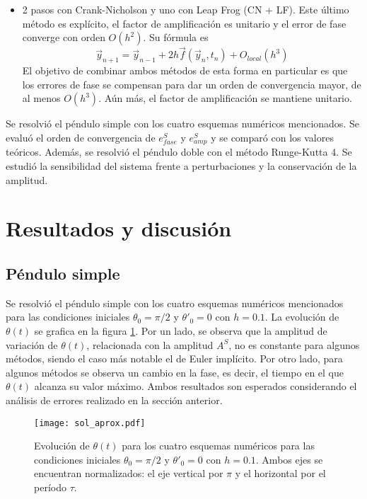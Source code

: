 \documentclass[aps,prb,twocolumn,superscriptaddress,floatfix,longbibliography,10pt]{revtex4-2}
\newif\ifptitle
\newif\ifpnumber
\newcounter{para}
\newcommand\ptitle[1]{\par\refstepcounter{para}
{\ifpnumber{\noindent\textcolor{lightgray}{\textbf{\thepara}}\indent}\fi}
{\ifptitle{\textbf{[{#1}]}}\fi}}
\begin{document}
\begin{itemize}
  \item 2 pasos con Crank-Nicholson y uno con Leap Frog (CN + LF). Este último método es explícito, el factor de amplificación es unitario y el error de fase converge con orden $O(h^2)$. Su fórmula es
  \begin{equation}
    \vec{y}_{n+1} = \vec{y}_{n-1} + 2 h \vec{f}(\vec{y}_n, t_n) + O_{local}(h^3)
    \label{eq:Leap_Frog}
  \end{equation}
  El objetivo de combinar ambos métodos de esta forma en particular es que los errores de fase se compensan para dar un orden de convergencia mayor, de al menos $O(h^3)$. Aún más, el factor de amplificación se mantiene unitario.


\end{itemize}

\ptitle{Resumen de lo que se hará. Qué se resuelve con qué}
Se resolvió el péndulo simple con los cuatro esquemas numéricos mencionados. Se evaluó el orden de convergencia de $e^S_{fase}$ y $e^S_{amp}$ y se comparó con los valores teóricos. Además, se resolvió el péndulo doble con el método Runge-Kutta 4. Se estudió la sensibilidad del sistema frente a perturbaciones y la conservación de la amplitud.





\section{Resultados y discusión}

\subsection{Péndulo simple}

Se resolvió el péndulo simple con los cuatro esquemas numéricos mencionados para las condiciones iniciales $\theta_0 = \pi/2$ y $\theta'_0 = 0$ con $h = 0.1$. La evolución de $\theta(t)$ se grafica en la figura \ref{fig:sol_aprox}. Por un lado, se observa que la amplitud de variación de $\theta(t)$, relacionada con la amplitud $A^S$, no es constante para algunos métodos, siendo el caso más notable el de Euler implícito. Por otro lado, para algunos métodos se observa un cambio en la fase, es decir, el tiempo en el que $\theta(t)$ alcanza su valor máximo. Ambos resultados son esperados considerando el análisis de errores realizado en la sección anterior.


\begin{figure}[h]
  \texttt{[image: sol\_aprox.pdf]}
  \caption{Evolución de $\theta(t)$ para los cuatro esquemas numéricos para las condiciones iniciales $\theta_0 = \pi/2$ y $\theta'_0 = 0$ con $h = 0.1$. Ambos ejes se encuentran normalizados: el eje vertical por $\pi$ y el horizontal por el período $\tau$.}
   \label{fig:sol_aprox}
\end{figure}
\end{document}
